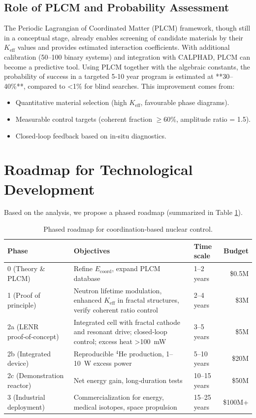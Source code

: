 \documentclass[12pt]{article}
\theoremstyle{remark}
\newcommand{\Keff}{K_{\mathrm{eff}}}
\begin{document}
	\subsection{Role of PLCM and Probability Assessment}
	
	The Periodic Lagrangian of Coordinated Matter (PLCM) framework, though still in a conceptual stage, already enables screening of candidate materials by their \(K_{\mathrm{eff}}\) values and provides estimated interaction coefficients. With additional calibration (50–100 binary systems) and integration with CALPHAD, PLCM can become a predictive tool. Using PLCM together with the algebraic constants, the probability of success in a targeted 5‑10 year program is estimated at **30–40\%**, compared to <1\% for blind searches. This improvement comes from:
	\begin{itemize}
		\item Quantitative material selection (high \(K_{\mathrm{eff}}\), favourable phase diagrams).
		\item Measurable control targets (coherent fraction $\geq 60\%$, amplitude ratio = 1.5).
		\item Closed‑loop feedback based on in‑situ diagnostics.
	\end{itemize}
	
	\section{Roadmap for Technological Development}
	\label{sec:roadmap}
	
	Based on the analysis, we propose a phased roadmap (summarized in Table \ref{tab:roadmap}).
	
	\begin{table}[htbp]
		\centering
		\caption{Phased roadmap for coordination‑based nuclear control.}
		\label{tab:roadmap}
		\small
		\begin{tabular}{l p{5cm} l r}
			\toprule
			\textbf{Phase} & \textbf{Objectives} & \textbf{Time scale} & \textbf{Budget} \\
			\midrule
			0 (Theory \& PLCM) & Refine \(E_{\mathrm{coord}}\), expand PLCM database & 1–2 years & \$0.5M \\
			1 (Proof of principle) & Neutron lifetime modulation, enhanced \(\Keff\) in fractal structures, verify coherent ratio control & 2–4 years & \$3M \\
			2a (LENR proof‑of‑concept) & Integrated cell with fractal cathode and resonant drive; closed‑loop control; excess heat >100~mW & 3–5 years & \$5M \\
			2b (Integrated device) & Reproducible \(^4\)He production, 1--10~W excess power & 5–10 years & \$20M \\
			2c (Demonstration reactor) & Net energy gain, long‑duration tests & 10–15 years & \$50M \\
			3 (Industrial deployment) & Commercialization for energy, medical isotopes, space propulsion & 15–25 years & \$100M+ \\
			\bottomrule
		\end{tabular}
	\end{table}
	
\end{document}
